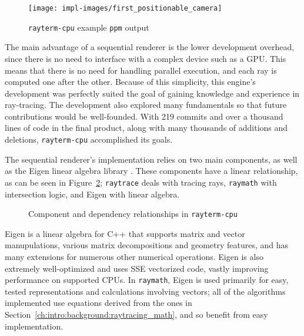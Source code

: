 \begin{figure}[htb]
  \centering
  \texttt{[image: impl-images/first\_positionable\_camera]}
  \caption{\texttt{rayterm-cpu} example \texttt{ppm} output}
  \label{fig:rayterm-cpu-ppm}
\end{figure}

The main advantage of a sequential renderer is the lower development overhead, since there is no need to interface with a complex device such as a GPU.
This means that there is no need for handling parallel execution, and each ray is computed one after the other.
Because of this simplicity, this engine's development was perfectly suited the goal of gaining knowledge  and experience in ray-tracing.
The development also explored many fundamentals so that future contributions would be well-founded.
With 219 commits and over a thousand lines of code in the final product, along with many thousands of additions and deletions, \texttt{rayterm-cpu} accomplished its goals.

 \label{ch:methods:renderer:sequential:components}

The sequential renderer's implementation relies on two main components, as well as the Eigen linear algebra library \cite{eigenweb}.
These components have a linear relationship, as can be seen in Figure~\ref{fig:rayterm-cpu-components}; \texttt{raytrace} deals with tracing rays, \texttt{raymath} with intersection logic, and Eigen with linear algebra.

\begin{figure}[htb]
  \centering
  \caption{Component and dependency relationships in \texttt{rayterm-cpu}}
  \label{fig:rayterm-cpu-components}
\end{figure}

Eigen \cite{eigenweb} is a linear algebra for C++ that supports matrix and vector manupulations, various matrix decompositions and geometry features, and has many extensions for numerous other numerical operations.
Eigen is also extremely well-optimized and uses SSE vectorized code, vastly improving performance on supported CPUs.
In \texttt{raymath}, Eigen is used primarily for easy, tested representations and calculations involving vectors; all of the algorithms implemented use equations derived from the ones in Section~\ref{ch:intro:background:raytracing_math}, and so benefit from easy implementation.

